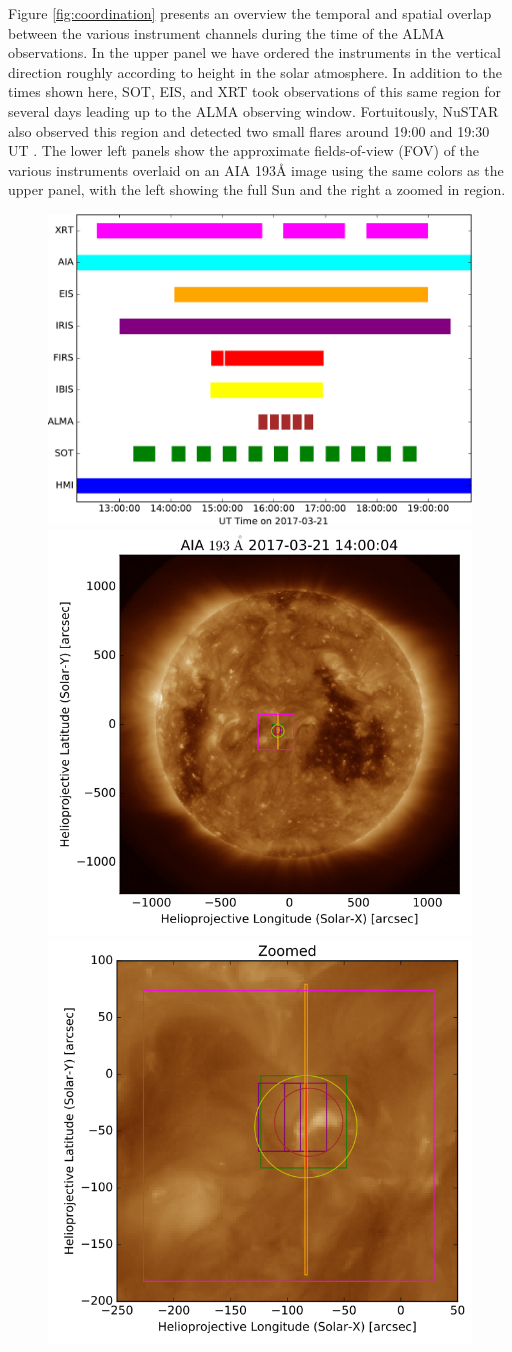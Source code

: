 \documentclass[twocolumn]{aastex62}
\newcommand{\figref}[1]{Figure \ref{#1}}
\begin{document}
\figref{fig:coordination} presents an overview the temporal and spatial overlap between the various instrument channels during the time of the ALMA observations. 
In the upper panel we have ordered the instruments in the vertical direction roughly according to height in the solar atmosphere.
In addition to the times shown here, SOT, EIS, and XRT took observations of this same region for several days leading up to the ALMA observing window.
Fortuitously, NuSTAR also observed this region and detected two small flares around 19:00 and 19:30 UT \citep{2018Kuhar}.
The lower left panels show the approximate fields-of-view (FOV) of the various instruments overlaid on an AIA 193\AA{} image using the same colors as the upper panel, with the left showing the full Sun and the right a zoomed in region.
\begin{figure}
    \centering
    \includegraphics[width=0.95\linewidth]{figures/obs_timing}
    \includegraphics[width=0.48\linewidth]{figures/AIA193_FOVs.png}
    \includegraphics[width=0.48\linewidth]{figures/AIA193_FOVs_zoom.png}

\end{figure}
\end{document}
